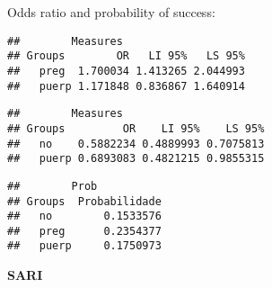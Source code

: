 \documentclass[
]{article}
\newenvironment{Shaded}{\begin{snugshade}}{\end{snugshade}}
\newcommand{\CommentTok}[1]{\textcolor[rgb]{0.56,0.35,0.01}{\textit{#1}}}
\newcommand{\KeywordTok}[1]{\textcolor[rgb]{0.13,0.29,0.53}{\textbf{#1}}}
\newcommand{\NormalTok}[1]{#1}
\newcommand{\OperatorTok}[1]{\textcolor[rgb]{0.81,0.36,0.00}{\textbf{#1}}}
\begin{document}
Odds ratio and probability of success:

\begin{Shaded}
\end{Shaded}

\begin{verbatim}
##        Measures
## Groups        OR   LI 95%   LS 95%
##   preg  1.700034 1.413265 2.044993
##   puerp 1.171848 0.836867 1.640914
\end{verbatim}

\begin{Shaded}
\end{Shaded}

\begin{verbatim}
##        Measures
## Groups         OR    LI 95%    LS 95%
##   no    0.5882234 0.4889993 0.7075813
##   puerp 0.6893083 0.4821215 0.9855315
\end{verbatim}

\begin{Shaded}
\end{Shaded}

\begin{verbatim}
##        Prob
## Groups  Probabilidade
##   no        0.1533576
##   preg      0.2354377
##   puerp     0.1750973
\end{verbatim}

\textbf{SARI}
\end{document}
